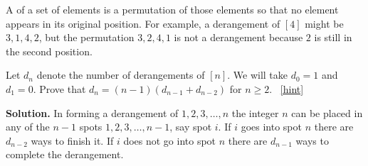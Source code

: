\documentclass{book}
\begin{document}
\setcounter{project}{100}
\addtocounter{project}{-1}
\begin{activity}[]\label{activity-93}
\hypertarget{p-742}{}%
A  of a set of elements is a permutation of those elements so that no element appears in its original position.  For example, a derangement of \([4]\) might be \(3,1,4,2\), but the permutation \(3,2,4,1\) is not a derangement because \(2\) is still in the second position.%
\par
\hypertarget{p-743}{}%
Let \(d_{n}\) denote the number of derangements of \([n]\).  We will take \(d_{0} = 1\) and \(d_{1} = 0\).  Prove that \(d_{n} = (n - 1)(d_{n - 1}+ d_{n - 2})\) for \(n \geq 2\).%
~\hfill{\tiny\hyperlink{a-100}{[hint]}\hypertarget{q-100}{}}\par\smallskip%
\noindent\textbf{Solution.}\hypertarget{solution-74}{}\quad%
\hypertarget{p-745}{}%
In forming a derangement of \(1, 2, 3, \ldots, n\) the integer \(n\) can be placed in any of the \(n - 1\) spots \(1, 2, 3, \ldots, n - 1\), say spot \(i\). If \(i\) goes into spot \(n\) there are \(d_{n - 2}\) ways to finish it. If \(i\) does not go into spot \(n\) there are \(d_{n - 1}\) ways to complete the derangement.%
\end{activity}
\end{document}
